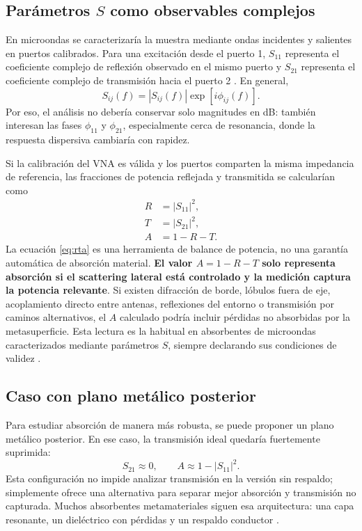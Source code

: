 \documentclass[12pt,a4paper]{article}
\begin{document}
\subsection{Parámetros \texorpdfstring{\(S\)}{S} como observables complejos}

En microondas se caracterizaría la muestra mediante ondas incidentes y salientes en puertos calibrados. Para una excitación desde el puerto 1, \(S_{11}\) representa el coeficiente complejo de reflexión observado en el mismo puerto y \(S_{21}\) representa el coeficiente complejo de transmisión hacia el puerto 2 \citep{pozar2011microwave}. En general,
\begin{equation}
  S_{ij}(f)=|S_{ij}(f)|\exp\left[i\phi_{ij}(f)\right].
  \label{eq:scomplex}
\end{equation}
Por eso, el análisis no debería conservar solo magnitudes en dB: también interesan las fases \(\phi_{11}\) y \(\phi_{21}\), especialmente cerca de resonancia, donde la respuesta dispersiva cambiaría con rapidez.

Si la calibración del VNA es válida y los puertos comparten la misma impedancia de referencia, las fracciones de potencia reflejada y transmitida se calcularían como
\begin{align}
  R &= |S_{11}|^2, \\
  T &= |S_{21}|^2, \\
  A &= 1-R-T.
  \label{eq:rta}
\end{align}
La ecuación \eqref{eq:rta} es una herramienta de balance de potencia, no una garantía automática de absorción material. \textbf{El valor \(A=1-R-T\) solo representa absorción si el scattering lateral está controlado y la medición captura la potencia relevante}. Si existen difracción de borde, lóbulos fuera de eje, acoplamiento directo entre antenas, reflexiones del entorno o transmisión por caminos alternativos, el \(A\) calculado podría incluir pérdidas no absorbidas por la metasuperficie. Esta lectura es la habitual en absorbentes de microondas caracterizados mediante parámetros \(S\), siempre declarando sus condiciones de validez \citep{landy2008perfect,watts2012metamaterial}.

\subsection{Caso con plano metálico posterior}

Para estudiar absorción de manera más robusta, se puede proponer un plano metálico posterior. En ese caso, la transmisión ideal quedaría fuertemente suprimida:
\begin{equation}
  S_{21}\approx0,
  \qquad
  A\approx1-|S_{11}|^2.
  \label{eq:backplane}
\end{equation}
Esta configuración no impide analizar transmisión en la versión sin respaldo; simplemente ofrece una alternativa para separar mejor absorción y transmisión no capturada. Muchos absorbentes metamateriales siguen esa arquitectura: una capa resonante, un dieléctrico con pérdidas y un respaldo conductor \citep{landy2008perfect,watts2012metamaterial}.
\end{document}
